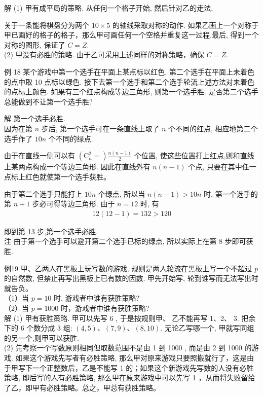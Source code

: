 \documentclass[10pt]{article}
\begin{document}
解 (1) 甲有成平局的策略. 从任何一个格子开始, 然后针对乙的走法,

关于一条能将棋盘分为两个 $10 \times 5$ 的轴线采取对称的动作. 如果乙画上一个对称于甲已画好的格子的格子，那么甲可画任何一个空格并重复这一过程.最后, 得到一个对称的图形, 保证了 $C=Z$.\\
(2) 甲没有必胜的策略. 由于乙可采用上述同样的对称策略，确保 $C=Z$.

例 18 某个游戏中第一个选手在平面上某点标以红色, 第二个选手在平面上未着色的点中取 10 点标以绿色. 接下去第一个选手和第二个选手轮流上述方法对未着色的点标上颜色. 如果有三个红点构成等边三角形, 则第一个选手胜. 是否第二个选手总能做到不让第一个选手胜?

解 第一个选手必胜.\\
因为在第 $n$ 步后, 第一个选手可在一条直线上取了 $n$ 个不同的红点, 相应地第二个选手作了 $10 n$ 个不同的绿点.

由于在直线一侧可以有 $\left(\mathrm{C}_{n}^{2}=\right) \frac{n(n-1)}{2}$ 个位置, 使这些位置打上红点,则和直线上某两点构成一个等边三角形. 因此在直线外有 $n(n-1)$ 个点, 只要在其中任一点标上红色就使第一个选手获胜。

由于第二个选手只能打上 $10 n$ 个绿点, 所以当 $n(n-1)>10 n$ 时, 第一个选手的第 $n+1$ 步必可得等边三角形. 由于 $n=12$ 时, 有\\
\begin{align*}
12(12-1)=132>120
\end{align*}

即到第 13 步,第一个选手必胜.\\
注 由于第一个选手可以避开第二个选手已标的绿点, 所以实际上在第 8 步即可获胜.

例19 甲、乙两人在黑板上玩写数的游戏, 规则是两人轮流在黑板上写一个不超过 $p$ 的自然数, 但禁止再写出黑板上已有数的因数. 甲先开始写, 轮到谁写而无法写出时就告负。\\
（1）当 $p=10$ 时, 游戏者中谁有获胜策略?\\
（2）当 $p=1000$ 时，游戏者中谁有获胜策略?\\
解 (1) 甲有获胜策略. 甲可以先写 6 , 于是按规则甲、 乙不能再写 1、2、 3. 把余下的 6 个数分成 3 组: $(4,5) 、(7,9) 、(8,10)$. 无论乙写哪一个, 甲就写同组的另一个,则甲可以获胜.\\
(2) 先考察一个写数原则相同但取数范围不是由 1 到 1000 , 而是由 2 到 1000 的游戏. 如果这个游戏先写者有必胜策略, 那么甲对原来游戏只要照搬就行了，这是由于甲写下一个正整数后，乙是不能写 1 的；如果这个新游戏先写数的人没有必胜策略, 即后写的人有必胜策略, 那么甲在原来游戏中可以先写 1 ，从而将失败留给了乙，即甲有必胜策略。总之，甲总有获胜策略。
\end{document}
